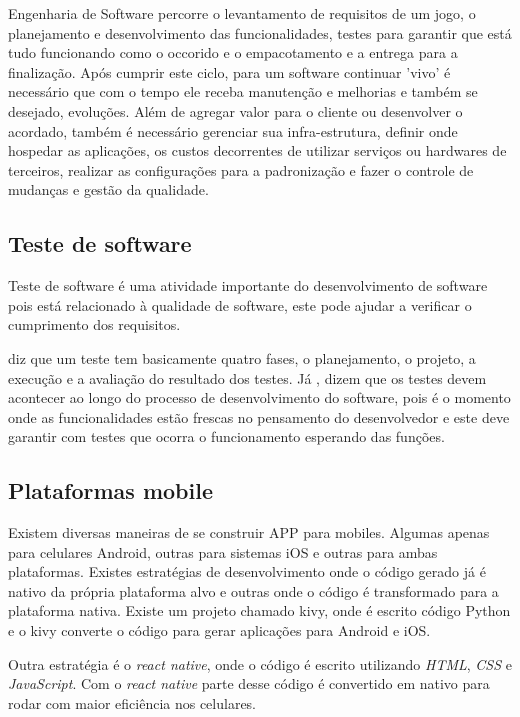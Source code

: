 Engenharia de Software percorre o levantamento de requisitos de um jogo, o planejamento e desenvolvimento das funcionalidades, testes para garantir que está tudo funcionando como o occorido e o empacotamento e a entrega para a finalização. Após cumprir este ciclo, para um software continuar 'vivo' é necessário que com o tempo ele receba manutenção e melhorias e também se desejado, evoluções. Além de agregar valor para o cliente ou desenvolver o acordado, também é necessário gerenciar sua infra-estrutura, definir onde hospedar as aplicações, os custos decorrentes de utilizar serviços ou hardwares de terceiros, realizar as configurações para a padronização e fazer o controle de mudanças e gestão da qualidade.

\subsection[Teste de software]{Teste de software}
Teste de software é uma atividade importante do desenvolvimento de software pois está relacionado à qualidade de software, este pode ajudar a verificar o cumprimento dos requisitos.

\cite[p. 17]{Pedro_Henrique} diz que um teste tem basicamente quatro fases, o planejamento, o projeto, a execução e a avaliação do resultado dos testes. Já \cite{pressman}, \cite{delamaroJinoMaldonado} dizem que os testes devem acontecer ao longo do processo de desenvolvimento do software, pois é o momento onde as funcionalidades estão frescas no pensamento do desenvolvedor e este deve garantir com testes que ocorra o funcionamento esperando das funções.


\subsection[Plataformas mobile]{Plataformas mobile}
Existem diversas maneiras de se construir APP para mobiles. Algumas apenas para celulares Android, outras para sistemas iOS e outras para ambas plataformas. Existes estratégias de desenvolvimento onde o código gerado já é nativo da própria plataforma alvo e outras onde o código é transformado para a plataforma nativa.
Existe um  projeto chamado kivy, onde é escrito código Python e o kivy converte o código para gerar aplicações para Android e iOS.

Outra estratégia é o \textit{react native}, onde o código é escrito utilizando \textit{HTML}, \textit{CSS} e \textit{JavaScript}. Com o \textit{react native} parte desse código é convertido em nativo para rodar com maior eficiência nos celulares.
